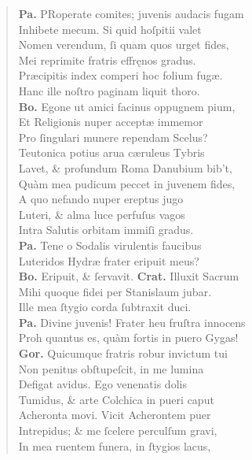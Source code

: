 \documentclass[a4paper,12pt]{article}
\begin{document}
\begin{verse}
\textbf{Pa.} PRoperate comites; juvenis audacis fugam\\[0pt]
Inhibete mecum. Si quid hoſpitii valet\\[0pt]
Nomen verendum, ſi quam quos urget fides,\\[0pt]
Mei reprimite fratris effręnos gradus.\\[0pt]
Præcipitis index comperi hoc folium fugæ.\\[0pt]
Hanc ille noſtro paginam liquit thoro.\\[0pt]
\textbf{Bo.} Egone ut amici facinus oppugnem pium,\\[0pt]
Et Religionis nuper acceptæ immemor\\[0pt]
Pro ſingulari munere rependam Scelus?\\[0pt]
Teutonica potius arua cæruleus Tybris\\[0pt]
Lavet, \& profundum Roma Danubium bib't,\\[0pt]
Quàm mea pudicum peccet in juvenem fides,\\[0pt]
A quo nefando nuper ereptus jugo\\[0pt]
Luteri, \& alma luce perfuſus vagos\\[0pt]
Intra Salutis orbitam immiſi gradus.\\[0pt]
\textbf{Pa.} Tene o Sodalis virulentis faucibus\\[0pt]
Luteridos Hydræ frater eripuit meus?\\[0pt]
\textbf{Bo.} Eripuit, \& ſervavit. \textbf{Crat.} Illuxit Sacrum\\[0pt]
Mihi quoque fidei per Stanislaum jubar.\\[0pt]
Ille mea ſtygio corda ſubtraxit duci.\\[0pt]
\textbf{Pa.} Divine juvenis! Frater heu fruſtra innocens\\[0pt]
Proh quantus es, quàm fortis in puero Gygas!\\[0pt]
\textbf{Gor.} Quicumque fratris robur invictum tui\\[0pt]
Non penitus obſtupeſcit, in me lumina\\[0pt]
Defigat avidus. Ego venenatis dolis\\[0pt]
Tumidus, \& arte Colchica in pueri caput\\[0pt]
Acheronta movi. Vicit Acherontem puer\\[0pt]
Intrepidus; \& me ſcelere perculſum gravi,\\[0pt]
In mea ruentem funera, in ſtygios lacus,\\[0pt]

\end{verse}
\end{document}
